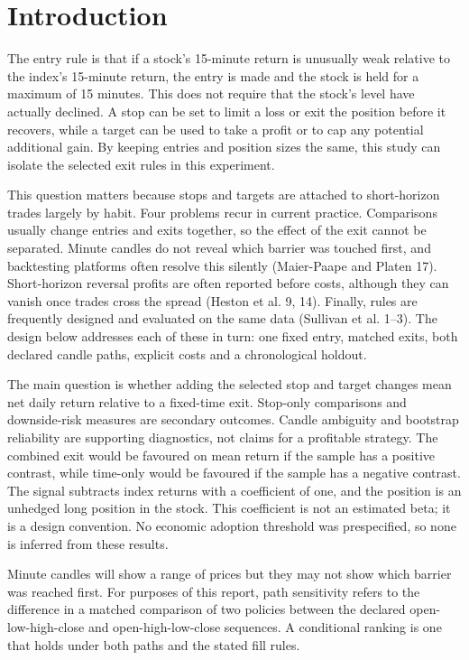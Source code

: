 \documentclass[11pt,a4paper]{article}
\begin{document}
\section*{Introduction}

The entry rule is that if a stock's 15-minute return is unusually weak relative to the index's 15-minute return, the entry is made and the stock is held for a maximum of 15 minutes. This does not require that the stock's level have actually declined. A stop can be set to limit a loss or exit the position before it recovers, while a target can be used to take a profit or to cap any potential additional gain. By keeping entries and position sizes the same, this study can isolate the selected exit rules in this experiment.

This question matters because stops and targets are attached to short-horizon trades largely by habit. Four problems recur in current practice. Comparisons usually change entries and exits together, so the effect of the exit cannot be separated. Minute candles do not reveal which barrier was touched first, and backtesting platforms often resolve this silently (Maier-Paape and Platen 17). Short-horizon reversal profits are often reported before costs, although they can vanish once trades cross the spread (Heston et al. 9, 14). Finally, rules are frequently designed and evaluated on the same data (Sullivan et al. 1--3). The design below addresses each of these in turn: one fixed entry, matched exits, both declared candle paths, explicit costs and a chronological holdout.

The main question is whether adding the selected stop and target changes mean net daily return relative to a fixed-time exit. Stop-only comparisons and downside-risk measures are secondary outcomes. Candle ambiguity and bootstrap reliability are supporting diagnostics, not claims for a profitable strategy. The combined exit would be favoured on mean return if the sample has a positive contrast, while time-only would be favoured if the sample has a negative contrast. The signal subtracts index returns with a coefficient of one, and the position is an unhedged long position in the stock. This coefficient is not an estimated beta; it is a design convention. No economic adoption threshold was prespecified, so none is inferred from these results.

Minute candles will show a range of prices but they may not show which barrier was reached first. For purposes of this report, path sensitivity refers to the difference in a matched comparison of two policies between the declared open-low-high-close and open-high-low-close sequences. A conditional ranking is one that holds under both paths and the stated fill rules.
\end{document}
